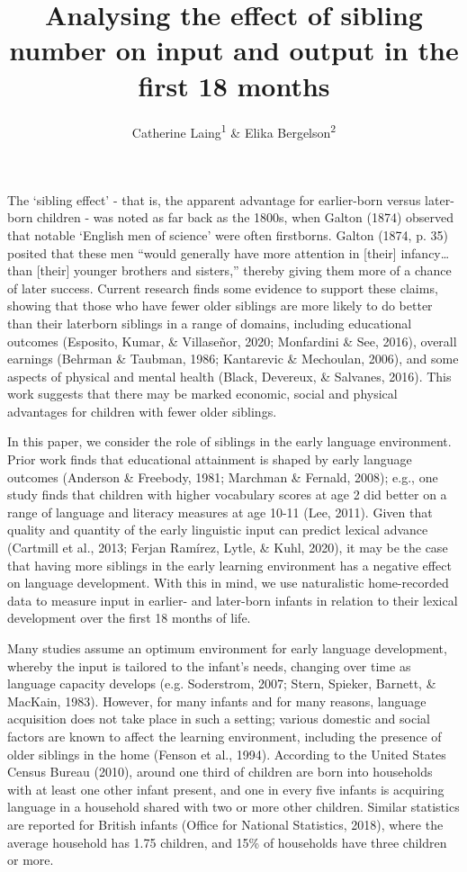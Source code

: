 \documentclass[
  english,
  man,floatsintext]{apa6}
\title{Analysing the effect of sibling number on input and output in the first 18 months}
\author{Catherine Laing\textsuperscript{1} \& Elika Bergelson\textsuperscript{2}}
\date{}
\affiliation{\vspace{0.5cm}\textsuperscript{1} Cardiff University, Cardiff, UK\\\textsuperscript{2} Duke University, Durham, NC, USA}
\begin{document}
\maketitle

The `sibling effect' - that is, the apparent advantage for earlier-born versus later-born children - was noted as far back as the 1800s, when Galton (1874) observed that notable `English men of science' were often firstborns. Galton (1874, p. 35) posited that these men ``would generally have more attention in {[}their{]} infancy\ldots than {[}their{]} younger brothers and sisters,'' thereby giving them more of a chance of later success. Current research finds some evidence to support these claims, showing that those who have fewer older siblings are more likely to do better than their laterborn siblings in a range of domains, including educational outcomes (Esposito, Kumar, \& Villaseñor, 2020; Monfardini \& See, 2016), overall earnings (Behrman \& Taubman, 1986; Kantarevic \& Mechoulan, 2006), and some aspects of physical and mental health (Black, Devereux, \& Salvanes, 2016). This work suggests that there may be marked economic, social and physical advantages for children with fewer older siblings.

In this paper, we consider the role of siblings in the early language environment. Prior work finds that educational attainment is shaped by early language outcomes (Anderson \& Freebody, 1981; Marchman \& Fernald, 2008); e.g., one study finds that children with higher vocabulary scores at age 2 did better on a range of language and literacy measures at age 10-11 (Lee, 2011). Given that quality and quantity of the early linguistic input can predict lexical advance (Cartmill et al., 2013; Ferjan Ramírez, Lytle, \& Kuhl, 2020), it may be the case that having more siblings in the early learning environment has a negative effect on language development. With this in mind, we use naturalistic home-recorded data to measure input in earlier- and later-born infants in relation to their lexical development over the first 18 months of life.

Many studies assume an optimum environment for early language development, whereby the input is tailored to the infant's needs, changing over time as language capacity develops (e.g. Soderstrom, 2007; Stern, Spieker, Barnett, \& MacKain, 1983). However, for many infants and for many reasons, language acquisition does not take place in such a setting; various domestic and social factors are known to affect the learning environment, including the presence of older siblings in the home (Fenson et al., 1994). According to the United States Census Bureau (2010), around one third of children are born into households with at least one other infant present, and one in every five infants is acquiring language in a household shared with two or more other children. Similar statistics are reported for British infants (Office for National Statistics, 2018), where the average household has 1.75 children, and 15\% of households have three children or more.
\end{document}
